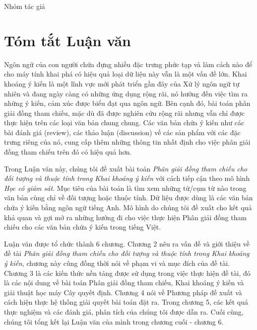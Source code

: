 \documentclass[12pt]{report}
\begin{document}
		\begin{flushright}
			Nhóm tác giả
		\end{flushright}

\newpage
	\thispagestyle{empty}
	\tableofcontents

\newpage
	\listoffigures
	\listoftables

\newpage
	\chapter{Tóm tắt Luận văn}		
		\par Ngôn ngữ của con người chứa đựng nhiều đặc trưng phức tạp và làm cách nào để cho máy tính khai phá có hiệu quả loại dữ liệu này vẫn là một vấn đề lớn. Khai khoáng ý kiến là một lĩnh vực mới phát triển gần đây của Xử lý ngôn ngữ tự nhiên và đang ngày càng có những ứng dụng rộng rãi, nó hướng đến việc tìm ra những ý kiến, cảm xúc được biểu đạt qua ngôn ngữ. Bên cạnh đó, bài toán phân giải đồng tham chiếu, mặc dù đã được nghiên cứu rộng rãi nhưng vẫn chỉ được thực hiện trên các loại văn bản chung chung. Các văn bản chứa ý kiến như các bài đánh giá (review), các thảo luận (discussion) về các sản phẩm với các đặc trưng riêng của nó, cung cấp thêm những thông tin nhất định cho việc phân giải đồng tham chiếu trên đó có hiệu quả hơn. 
		\par Trong Luận văn này, chúng tôi đề xuất bài toán \textit{Phân giải đồng tham chiếu cho đối tượng và thuộc tính trong Khai khoáng ý kiến} với cách tiếp cận theo mô hình \textit{Học có giám sát}. Mục tiêu của bài toán là tìm xem những từ/cụm từ nào trong văn bản cùng chỉ về đối tượng hoặc thuộc tính. Dữ liệu được dùng là các văn bản chứa ý kiến bằng ngôn ngữ tiếng Anh. Mô hình do chúng tôi đề xuất cho kết quả khả quan và gợi mở ra những hướng đi cho việc thực hiện Phân giải đồng tham chiếu cho các văn bản chứa ý kiến trong tiếng Việt.
		\par Luận văn được tổ chức thành 6 chương. Chương 2 nêu ra vấn đề và giới thiệu về đề tài \textit{Phân giải đồng tham chiếu cho đối tượng và thuộc tính trong Khai khoáng ý kiến}, chương này cũng đồng thời nói về phạm vi và mục đích của đề tài. Chương 3 là các kiến thức nền tảng được sử dụng trong việc thực hiện đề tài, đó là các nội dung về bài toán Phân giải đồng tham chiếu, Khai khoáng ý kiến và giải thuật học máy Cây quyết định. Chương 4 nói về Phương pháp đề xuất và cách hiện thực hệ thống giải quyết bài toán đặt ra. Trong chương 5, các kết quả thực nghiệm và các đánh giá, phân tích của chúng tôi được dẫn ra. Cuối cùng, chúng tôi tổng kết lại Luận văn của mình trong chương cuối - chương 6.
		
\end{document}
